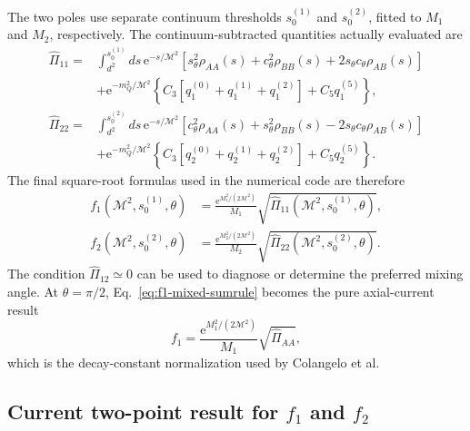 \documentclass[11pt]{article}
\newcommand{\ee}{\mathrm{e}}
\begin{document}
The two poles use separate continuum thresholds
$s_0^{(1)}$ and $s_0^{(2)}$, fitted to $M_1$ and $M_2$, respectively.  The
continuum-subtracted quantities actually evaluated are
\begin{align}
  \widehat\Pi_{11}={}&
  \int_{d^2}^{s_0^{(1)}}ds\,\ee^{-s/\mathcal M^2}
  \left[
    s_\theta^2\rho_{AA}(s)
    +c_\theta^2\rho_{BB}(s)
    +2s_\theta c_\theta\rho_{AB}(s)
  \right]
  \nonumber\\
  &+\ee^{-m_Q^2/\mathcal M^2}
  \left\{C_3[q_1^{(0)}+q_1^{(1)}+q_1^{(2)}]
  +C_5q_1^{(5)}\right\},
  \label{eq:pi11-explicit-ope}\\
  \widehat\Pi_{22}={}&
  \int_{d^2}^{s_0^{(2)}}ds\,\ee^{-s/\mathcal M^2}
  \left[
    c_\theta^2\rho_{AA}(s)
    +s_\theta^2\rho_{BB}(s)
    -2s_\theta c_\theta\rho_{AB}(s)
  \right]
  \nonumber\\
  &+\ee^{-m_Q^2/\mathcal M^2}
  \left\{C_3[q_2^{(0)}+q_2^{(1)}+q_2^{(2)}]
  +C_5q_2^{(5)}\right\}.
  \label{eq:pi22-explicit-ope}
\end{align}
The final square-root formulas used in the numerical code are therefore
\begin{align}
  \boxed{f_1(\mathcal M^2,s_0^{(1)},\theta)}
  &=\frac{\ee^{M_1^2/(2\mathcal M^2)}}{M_1}
  \sqrt{\widehat\Pi_{11}(\mathcal M^2,s_0^{(1)},\theta)},
  \label{eq:f1-mixed-sumrule}\\
  \boxed{f_2(\mathcal M^2,s_0^{(2)},\theta)}
  &=\frac{\ee^{M_2^2/(2\mathcal M^2)}}{M_2}
  \sqrt{\widehat\Pi_{22}(\mathcal M^2,s_0^{(2)},\theta)}.
  \label{eq:f2-mixed-sumrule}
\end{align}
The condition $\widehat\Pi_{12}\simeq0$ can be used to diagnose or determine
the preferred mixing angle.  At $\theta=\pi/2$,
Eq.~\eqref{eq:f1-mixed-sumrule} becomes the pure axial-current result
\begin{equation}
  f_1=\frac{\ee^{M_1^2/(2\mathcal M^2)}}{M_1}
  \sqrt{\widehat\Pi_{AA}},
\end{equation}
which is the decay-constant normalization used by Colangelo et al.

\subsection{Current two-point result for $f_1$ and $f_2$}
\end{document}
